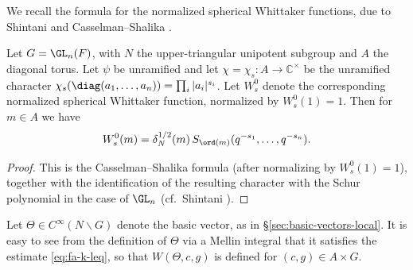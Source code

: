 We recall the formula for the normalized spherical Whittaker functions, due to Shintani \cite{MR407208} and Casselman--Shalika \cite[Thm 5.4]{MR581582}.
\begin{lemma}\label{lem:standard:spherical-whittaker-schur}
  Let $G=\GL_n(F)$, with $N$ the upper-triangular unipotent subgroup and $A$ the diagonal torus.  Let $\psi$ be unramified and let $\chi=\chi_s : A \rightarrow \mathbb{C}^\times$ be the unramified character $\chi_s(\diag(a_1,\dotsc,a_n))=\prod_i |a_i|^{s_i}$.  Let $W_s^0$ denote the corresponding normalized spherical Whittaker function, normalized by $W_s^0(1)=1$.  Then for $m \in A$ we have
  \begin{equation*}
    W_s^0(m)=\delta_N^{1/2}(m)\,S_{\ord(m)}(q^{-s_1},\dotsc,q^{-s_n}).
  \end{equation*}
\end{lemma}
\begin{proof}
  This is the Casselman--Shalika formula (after normalizing by $W_s^0(1)=1$), together with the identification of the resulting character with the Schur polynomial in the case of $\GL_n$ (cf.\ Shintani \cite{MR407208}).
\end{proof}

Let $\Theta \in C^\infty(N \backslash G)$ denote the basic vector, as in \S\ref{sec:basic-vectors-local}.  It is easy to see from the definition of $\Theta$ via a Mellin integral that it satisfies the estimate \eqref{eq:fa-k-leq}, so that $W(\Theta,c,g)$ is defined for $(c,g) \in A \times G$.

